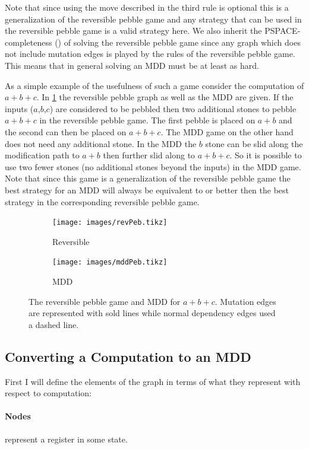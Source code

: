 Note that since using the move described in the third rule is optional this is
a generalization of the reversible pebble game and any strategy that can be
used in the reversible pebble game is a valid strategy here. We also inherit
the PSPACE-completeness (\cite{chan13}) of solving the reversible pebble game
since any graph which does not include mutation edges is played by the rules of
the reversible pebble game. This means that in general solving an MDD must be
at least as hard.

As a simple example of the usefulness of such a game consider the computation
of $a+b+c$. In \cref{fig:mddExample} the reversible pebble graph as well as the
MDD are given. If the inputs ($a$,$b$,$c$) are considered to be pebbled then
two additional stones to pebble $a+b+c$ in the reversible pebble game. The
first pebble is placed on $a+b$ and the second can then be placed on $a+b+c$.
The MDD game on the other hand does not need any additional stone. In the MDD
the $b$ stone can be slid along the modification path to $a+b$ then further
slid along to $a+b+c$. So it is possible to use two fewer stones (no additional
stones beyond the inputs) in the MDD game. Note that since this game is a
generalization of the reversible pebble game the best strategy for an MDD will
always be equivalent to or better then the best strategy in the corresponding
reversible pebble game.

\begin{figure}
  \centering
  \begin{subfigure}{0.3\textwidth}
    \texttt{[image: images/revPeb.tikz]}
    \caption{Reversible}
  \end{subfigure}
  \qquad\qquad
  \begin{subfigure}{0.3\textwidth}
    \texttt{[image: images/mddPeb.tikz]}
    \caption{MDD}
  \end{subfigure}
  \label{fig:mddExample}
  \caption{The reversible pebble game and MDD for $a+b+c$. Mutation edges are
  represented with sold lines while normal dependency edges used a dashed line.}
\end{figure}


\subsection{Converting a Computation to an MDD}

First I will define the elements of the graph in terms of what they represent
with respect to computation:

\paragraph{Nodes} represent a register in some state.

